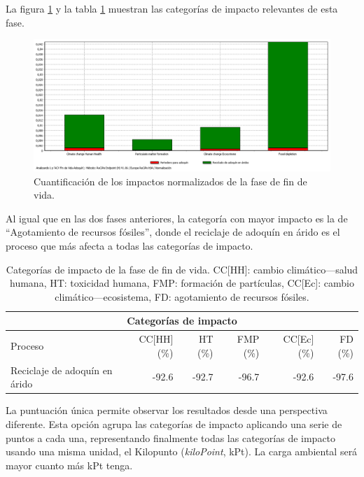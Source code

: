 La figura \ref{fig:fdv_normalizacion} y la tabla \ref{categoriasimpactofdv} muestran las categorías de impacto relevantes de esta fase.

\begin{figure}[!htb]
\centering
\includegraphics[width=15cm]{img/fdv_normalizacion.png}
\caption{Cuantificación de los impactos normalizados de la fase de fin de vida.}
\label{fig:fdv_normalizacion}
\end{figure}

Al igual que en las dos fases anteriores, la categoría con mayor impacto es la de ``Agotamiento de recursos fósiles'', donde el reciclaje de adoquín en árido es el proceso que más afecta a todas las categorías de impacto.

\begin{table}[!htb]
\centering
\begin{tabular}{p{4cm}rrrrr}
\toprule
\multicolumn{6}{c}{Categorías de impacto}\\
\midrule
Proceso & CC[HH] (\%) & HT (\%) & FMP (\%) & CC[Ec] (\%) & FD (\%)\\
\midrule
Reciclaje de adoquín en árido & -92.6 & -92.7 & -96.7 & -92.6 & -97.6\\
\bottomrule
\end{tabular}
\caption[Categorías de impacto de la fase de fin de vida.]{Categorías de impacto de la fase de fin de vida. CC[HH]: cambio climático—salud humana, HT: toxicidad humana, FMP: formación de partículas, CC[Ec]: cambio climático—ecosistema, FD: agotamiento de recursos fósiles.}
\label{categoriasimpactofdv}
\end{table}

La puntuación única permite observar los resultados desde una perspectiva diferente. Esta opción agrupa las categorías de impacto aplicando una serie de puntos a cada una, representando finalmente todas las categorías de impacto usando una misma unidad, el Kilopunto (\textit{kiloPoint}, kPt). La carga ambiental será mayor cuanto más kPt tenga.

